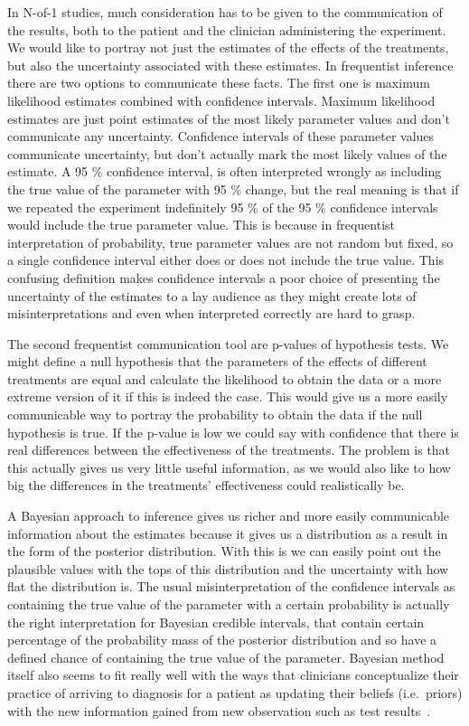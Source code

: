 \documentclass[12pt,a4paper,leqno]{report}
\theoremstyle{plain}
\theoremstyle{definition}
\theoremstyle{remark}
\begin{document}
In N-of-1 studies, much consideration has to be given to the communication of the
results, both to the patient and the clinician administering the experiment. We
would like to portray not just the estimates of the effects of the treatments,
but also the uncertainty associated with these estimates. In frequentist
inference there are two options to communicate these facts. The first one is
maximum likelihood estimates combined with confidence intervals. Maximum
likelihood estimates are just point estimates of the most likely parameter values and don't
communicate any uncertainty. Confidence intervals of these parameter values communicate uncertainty, but
don't actually mark the most likely values of the estimate. A 95 \%
confidence interval, is often interpreted wrongly as including the true value of
the parameter with 95 \% change, but the real meaning is that if we repeated the
experiment indefinitely 95 \% of the 95 \% confidence intervals would include
the true parameter value. This is because in frequentist interpretation of
probability, true parameter values are not random but fixed, so a single
confidence interval either does or does not include the true value. This
confusing definition makes confidence intervals a poor choice of presenting the
uncertainty of the estimates to a lay audience as they might create lots of misinterpretations and
even when interpreted correctly are hard to grasp.

The second frequentist communication tool are p-values of hypothesis tests. We
might define a null hypothesis that the parameters of the effects of different
treatments are equal and calculate the likelihood to obtain the data or a more
extreme version of it if this is indeed the case. This would give us a more
easily communicable way to portray the probability to obtain the data if the null
hypothesis is true. If the p-value is low we could say with confidence
that there is real differences between the effectiveness of the treatments. The
problem is that this actually gives us very little useful information, as we
would also like to how big the differences in the treatments' effectiveness
could realistically be.

A Bayesian approach to inference gives us richer and more easily communicable
information about the estimates because it gives us a distribution as a
result in the form of the posterior distribution. With this is we can easily point out the plausible values
with the tops of this distribution and the uncertainty with how flat the
distribution is. The usual misinterpretation of the confidence intervals as
containing the true value of the parameter with a certain probability is actually
the right interpretation for Bayesian credible intervals, that contain certain
percentage of the probability mass of the posterior distribution and so have a
defined chance of containing the true value of the parameter. Bayesian method itself also seems to fit really well with the ways that clinicians conceptualize
their practice of arriving to  diagnosis for a patient as updating their beliefs
(i.e.\ priors) with the new information gained from new observation such as test
results\ \cite{clinbayes}.
\end{document}
